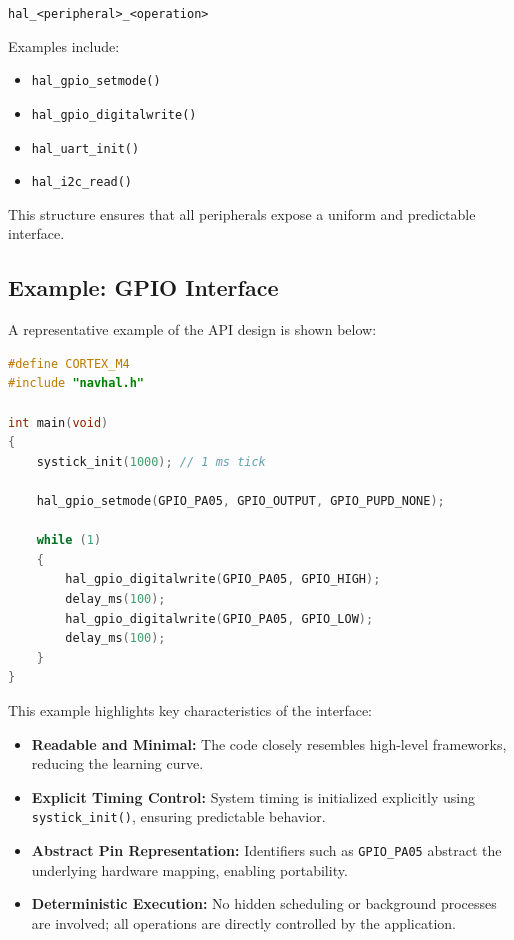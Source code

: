 \begin{center}
\texttt{hal\_<peripheral>\_<operation>}
\end{center}

Examples include:

\begin{itemize}
    \item \texttt{hal\_gpio\_setmode()}
    \item \texttt{hal\_gpio\_digitalwrite()}
    \item \texttt{hal\_uart\_init()}
    \item \texttt{hal\_i2c\_read()}
\end{itemize}

This structure ensures that all peripherals expose a uniform and predictable interface.

\subsection*{Example: GPIO Interface}

A representative example of the API design is shown below:

\begin{lstlisting}[language=C, caption={Example LED blink using NavHAL}]
#define CORTEX_M4
#include "navhal.h"

int main(void)
{
    systick_init(1000); // 1 ms tick

    hal_gpio_setmode(GPIO_PA05, GPIO_OUTPUT, GPIO_PUPD_NONE);

    while (1)
    {
        hal_gpio_digitalwrite(GPIO_PA05, GPIO_HIGH);
        delay_ms(100);
        hal_gpio_digitalwrite(GPIO_PA05, GPIO_LOW);
        delay_ms(100);
    }
}
\end{lstlisting}

This example highlights key characteristics of the interface:

\begin{itemize}
    \item \textbf{Readable and Minimal:}  
    The code closely resembles high-level frameworks, reducing the learning curve.

    \item \textbf{Explicit Timing Control:}  
    System timing is initialized explicitly using \texttt{systick\_init()}, ensuring predictable behavior.

    \item \textbf{Abstract Pin Representation:}  
    Identifiers such as \texttt{GPIO\_PA05} abstract the underlying hardware mapping, enabling portability.

    \item \textbf{Deterministic Execution:}  
    No hidden scheduling or background processes are involved; all operations are directly controlled by the application.
\end{itemize}


